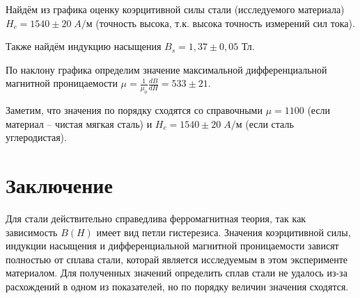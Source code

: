 Найдём из графика оценку коэрцитивной силы стали (исследуемого материала) $H_c = 1540 \pm 20 \; A/\text{м}$ (точность высока, т.к. высока точность измерений сил тока). 

Также найдём индукцию насыщения $B_s = 1,37 \pm 0,05$ Тл.

По наклону графика определим значение максимальной дифференциальной магнитной проницаемости $\mu = \frac{1}{\mu_0} \frac{dB}{dH} = 533 \pm 21$. 

Заметим, что значения по порядку сходятся со справочными $\mu = 1100$ (если материал -- чистая мягкая сталь) и $H_c = 1540 \pm 20 \; A/\text{м}$ (если сталь углеродистая).

\section{Заключение}

Для стали действительно справедлива ферромагнитная теория, так как зависимость $B(H)$ имеет вид петли гистерезиса. Значения коэрцитивной силы, индукции насыщения и дифференциальной магнитной проницаемости зависят полностью от сплава стали, которай является исследуемым в этом эксперименте материалом. Для полученных значений определить сплав стали не удалось из-за расхождений в одном из показателей, но по порядку величин значения сходятся.




























